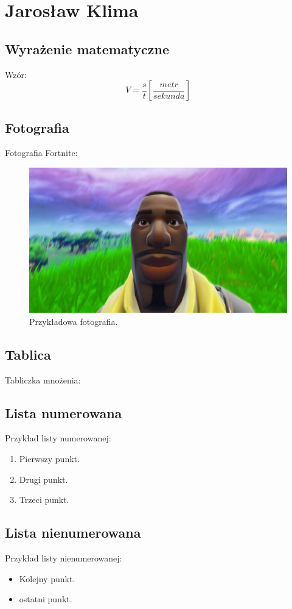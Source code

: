 \section{Jarosław Klima}
\label{sec:jk}

\subsection{Wyrażenie matematyczne}
Wzór: $$V = \frac{s}{t} [\frac{metr}{sekunda}]$$

\subsection{Fotografia}
Fotografia Fortnite:
\begin{figure}[htbp]
    \centering
    \includegraphics[width=0.6\linewidth]{pictures/JaroslawKlimaPic.jpg}
    \caption{Przykładowa fotografia.}
    \label{fig:fortnite}
\end{figure}

\subsection{Tablica}
Tabliczka mnożenia:


\subsection{Lista numerowana}
Przykład listy numerowanej:
\begin{enumerate}
  \item Pierwszy punkt.
  \item Drugi punkt.
  \item Trzeci punkt.
\end{enumerate}

\subsection{Lista nienumerowana}
Przykład listy nienumerowanej:
\begin{itemize}
  \item Kolejny punkt.
  \item ostatni punkt.  
\end{itemize}

